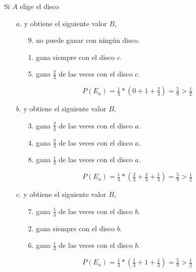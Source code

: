 Si $A$ elige el disco
\begin{enumerate}
    \item[$a.$]
    y obtiene el siguiente valor $B$,
    \begin{enumerate}
        \item[9.] no puede ganar con ningún disco.
        \item[1.] gana siempre con el disco $c$.
        \item[5.] gana $\tfrac{2}{3}$ de las veces con el disco $c$.
    \end{enumerate}
    \[ P(E_a) = \tfrac{1}{3} * (0 + 1 + \tfrac{2}{3}) = \tfrac{5}{9} > \tfrac{1}{2} \]
    \item[$b.$]
    y obtiene el siguiente valor $B$,
    \begin{enumerate}
        \item[3.] gana $\tfrac{2}{3}$ de las veces con el disco $a$.
        \item[4.] gana $\tfrac{2}{3}$ de las veces con el disco $a$.
        \item[8.] gana $\tfrac{1}{3}$ de las veces con el disco $a$.
    \end{enumerate}
    \[ P(E_a) = \tfrac{1}{3} * (\tfrac{2}{3} + \tfrac{2}{3} + \tfrac{1}{3}) = \tfrac{5}{9} > \tfrac{1}{2} \]
    \item[$c.$]
    y obtiene el siguiente valor $B$,
    \begin{enumerate}
        \item[7.] gana $\tfrac{1}{3}$ de las veces con el disco $b$.
        \item[2.] gana siempre con el disco $b$.
        \item[6.] gana $\tfrac{1}{3}$ de las veces con el disco $b$.
    \end{enumerate}
    \[ P(E_a) = \tfrac{1}{3} * (\tfrac{1}{3} + 1 + \tfrac{1}{3}) = \tfrac{5}{9} > \tfrac{1}{2} \]
\end{enumerate}